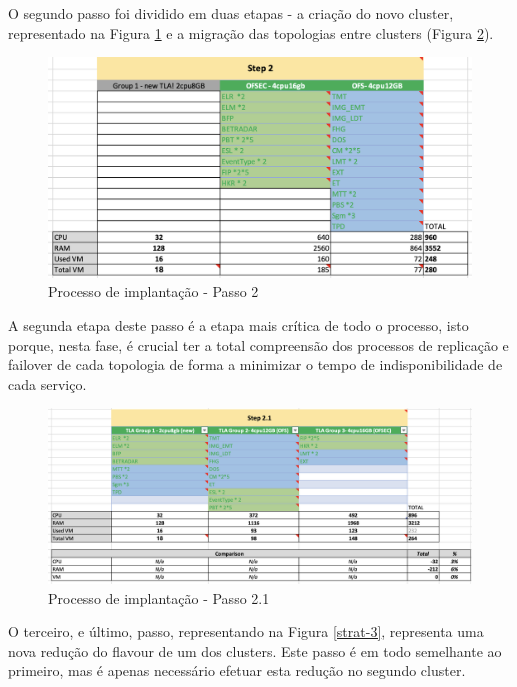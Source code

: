 O segundo passo foi dividido em duas etapas - a criação do novo \gls{cluster}, representado na 
Figura \ref{strat-2} e a migração das topologias entre \glspl{cluster} (Figura \ref{strat-2_1}).

\begin{figure}[H]
  \centerline{\includegraphics[scale=0.5]{media/content/analise/strat-2.png}}
  \caption{Processo de implantação - Passo 2}
  \label{strat-2}
\end{figure}

A segunda etapa deste passo é a etapa mais crítica de todo o processo, isto porque, nesta fase, é
crucial ter a total compreensão dos processos de replicação e \gls{failover} de cada topologia de
forma a minimizar o tempo de indisponibilidade de cada serviço.

\begin{figure}[H]
  \centerline{\includegraphics[scale=0.4]{media/content/analise/strat-2_1.png}}
  \caption{Processo de implantação - Passo 2.1}
  \label{strat-2_1}
\end{figure}

O terceiro, e último, passo, representando na Figura \ref{strat-3}, representa uma nova redução 
do \gls{flavour} de um dos \glspl{cluster}. Este passo é em todo semelhante ao primeiro, mas é
apenas necessário efetuar esta redução no segundo \gls{cluster}.

